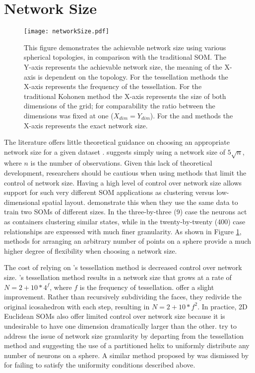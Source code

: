 \section{Network Size}
\begin{figure}
\centering
\texttt{[image: networkSize.pdf]}
\caption{This figure demonstrates the achievable network size using various
spherical topologies, in comparison with the traditional SOM. The Y-axis represents the achievable network size, the
meaning of the X-axis is dependent on the topology. For the tessellation
methods the X-axis represents the frequency of the tessellation. For the
traditional Kohonen method the X-axis represents the size of both dimensions of
the grid; for comparability the ratio between the dimensions was fixed at one
($X_{dim}=Y_{dim}$).  For the \cite{Rakhmanov94} and \cite{Nishio:2006fk} methods the X-axis
represents the exact network size.}
\label{fig:nSize}
\end{figure}
The literature offers little theoretical guidance on choosing an appropriate
network size for a given dataset \citep{cho1996}.  \cite{toolbox} suggests
simply using a network size of \(5\sqrt {n}\), where \(n\) is the number of
observations. Given this lack of theoretical development, researchers should be
cautious when using methods that limit the control of network size.  Having a
high level of control over network size allows support for such very
different SOM applications as clustering versus low-dimensional spatial layout.
\cite{skupin07} demonstrate this when they use the same data to train two SOMs
of different sizes.  In the three-by-three (9) case the neurons act as
containers clustering similar states, while in the twenty-by-twenty (400) case
relationships are expressed with much finer granularity. As shown in
Figure \ref{fig:nSize}, methods for arranging an arbitrary number of points on a
sphere provide a much higher degree of flexibility when choosing a network
size.

The cost of relying on \citeauthor{ritter99}'s tessellation method is decreased
control over network size. \citeauthor{ritter99}'s tessellation method results
in a network size that grows at a rate of \(N=2+10*4^f\), where $f$ is the
frequency of tessellation. \cite{wu2006} offer a slight improvement. Rather than
recursively subdividing the faces, they redivide the original icosahedron with
each step, resulting in \(N=2+10*f^2\).  In practice, 2D Euclidean SOMs also offer
limited control over network size because it is undesirable to have one dimension
dramatically larger than the other. \cite{Nishio:2006fk} try to address the
issue of network size granularity by departing from the tessellation method and
suggesting the use of a partitioned helix to uniformly distribute any number of
neurons on a sphere.  A similar method proposed by \cite{Rakhmanov94} was
dismissed by \cite{wu2005} for failing to satisfy the uniformity conditions
described above.


